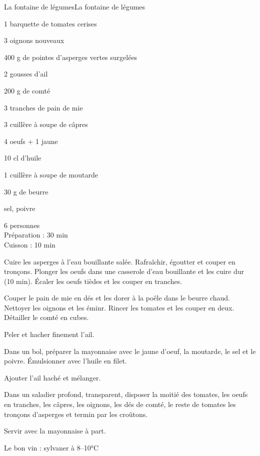 \begin{recette}{La fontaine de légumes}{La fontaine de légumes}

\begin{ingredients}
1 barquette de tomates cerises\par
3 oignons nouveaux\par
400 g de pointes d'asperges vertes surgelées\par
2 gousses d'ail\par
200 g de comté\par
3 tranches de pain de mie\par
3 cuillère à soupe de câpres\par
4 oeufs + 1 jaune\par
10 cl d'huile\par
1 cuillère à soupe de moutarde\par
30 g de beurre\par
sel, poivre\par
\end{ingredients}

\begin{infos}
6 personnes\\
Préparation : 30 min\\
Cuisson : 10 min\\
\end{infos}

\begin{etapes}
\item Cuire les asperges à l'eau bouillante salée. Rafraîchir, égoutter et couper en tronçons. Plonger les oeufs dans une casserole d'eau bouillante et les cuire dur (10 min). Écaler les oeufs tièdes et les couper en tranches.
\item Couper le pain de mie en dés et les dorer à la poêle dans le beurre chaud. Nettoyer les oignons et les éminr. Rincer les tomates et les couper en deux. Détailler le comté en cubes.
\item Peler et hacher finement l'ail.
\item Dans un bol, préparer la mayonnaise avec le jaune d'oeuf, la moutarde, le sel et le poivre. Émulsionner avec l'huile en filet.
\item Ajouter l'ail haché et mélanger.
\item Dans un saladier profond, transparent, disposer la moitié des tomates, les oeufs en tranches, les câpres, les oignons, les dés de comté, le reste de tomates les tronçons d'asperges et termin par les croûtons.
\item Servir avec la mayonnaise à part.
\end{etapes}

\begin{conseils}
Le bon vin : sylvaner à 8--10°C
	
\end{conseils}

\end{recette}